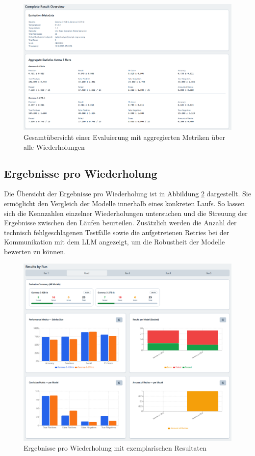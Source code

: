 \begin{figure}[h]
    \centering
    \includegraphics[width=\textwidth]{images/evaluation/evaluation-result-overview_new}
    \caption{Gesamtübersicht einer Evaluierung mit aggregierten Metriken über alle Wiederholungen}
    \label{fig:evaluation-overview}
\end{figure}

\subsection*{Ergebnisse pro Wiederholung}

Die Übersicht der Ergebnisse pro Wiederholung ist in Abbildung \ref{fig:evaluation-by-run} dargestellt. Sie ermöglicht den Vergleich der Modelle innerhalb eines konkreten Laufs. So lassen sich die Kennzahlen einzelner Wiederholungen untersuchen und die Streuung der Ergebnisse zwischen den Läufen beurteilen. Zusätzlich werden die Anzahl der technisch fehlgeschlagenen Testfälle sowie die aufgetretenen Retries bei der Kommunikation mit dem \ac{LLM} angezeigt, um die Robustheit der Modelle bewerten zu können.

\begin{figure}[h]
    \centering
    \includegraphics[width=\textwidth]{images/evaluation/evaluation-result-by-run_new}
    \caption{Ergebnisse pro Wiederholung mit exemplarischen Resultaten}
    \label{fig:evaluation-by-run}
\end{figure}


